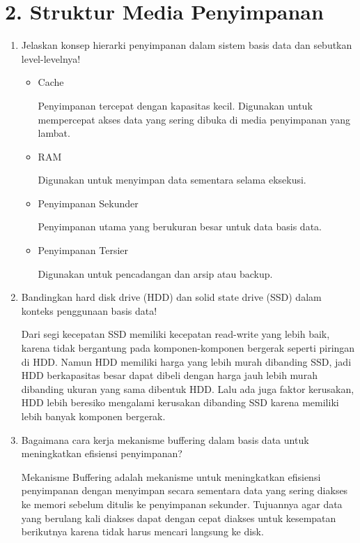 \documentclass[a4paper,11pt]{article}
\begin{document}
\section*{2. Struktur Media Penyimpanan}
\begin{enumerate}[label=\alph*.]
    \item Jelaskan konsep hierarki penyimpanan dalam sistem basis data dan sebutkan level-levelnya!


      \begin{itemize}
        \item Cache

          Penyimpanan tercepat dengan kapasitas kecil. Digunakan untuk mempercepat
          akses data yang sering dibuka di media penyimpanan yang lambat.

        \item RAM

          Digunakan untuk menyimpan data sementara selama eksekusi.
          
        \item Penyimpanan Sekunder

          Penyimpanan utama yang berukuran besar untuk data basis data.

        \item Penyimpanan Tersier

          Digunakan untuk pencadangan dan arsip atau backup.

        \end{itemize}

    \item Bandingkan hard disk drive (HDD) dan solid state drive (SSD) dalam konteks penggunaan basis data!

      Dari segi kecepatan SSD memiliki kecepatan read-write yang lebih baik, karena tidak bergantung
      pada komponen-komponen bergerak seperti piringan di HDD. Namun HDD memiliki harga
      yang lebih murah dibanding SSD, jadi HDD berkapasitas besar dapat dibeli dengan harga jauh
      lebih murah dibanding ukuran yang sama dibentuk HDD. Lalu ada juga faktor kerusakan,
      HDD lebih beresiko mengalami kerusakan dibanding SSD karena memiliki lebih banyak komponen
      bergerak.

    \item Bagaimana cara kerja mekanisme buffering dalam basis data untuk meningkatkan efisiensi penyimpanan?

      Mekanisme Buffering adalah mekanisme untuk meningkatkan efisiensi penyimpanan dengan menyimpan
      secara sementara data yang sering diakses ke memori sebelum ditulis ke penyimpanan sekunder.
      Tujuannya agar data yang berulang kali diakses dapat dengan cepat diakses untuk kesempatan
      berikutnya karena tidak harus mencari langsung ke disk.

\end{enumerate}
\end{document}
